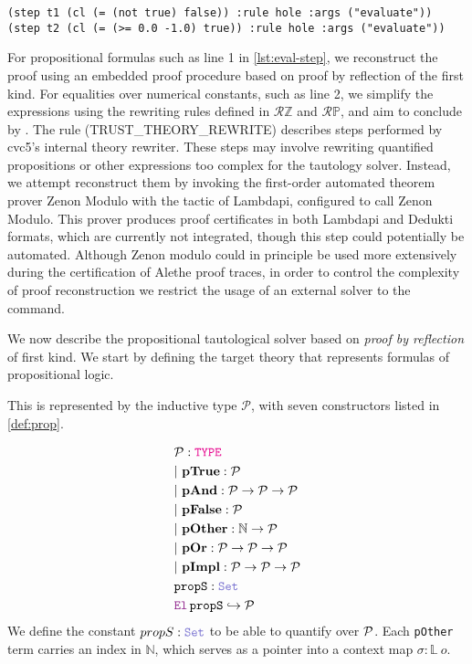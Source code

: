 \smallskip

\begin{lstlisting}[language=SMT,caption={An example of proof trace using the cvc5 $\kw{evaluate}$ rule.},label={lst:eval-step}]
(step t1 (cl (= (not true) false)) :rule hole :args ("evaluate"))
(step t2 (cl (= (>= 0.0 -1.0) true)) :rule hole :args ("evaluate"))
\end{lstlisting}

\smallskip

For propositional formulas such as line 1 in \cref{lst:eval-step}, we reconstruct the proof using an embedded proof procedure based on proof by reflection of the first kind.
For equalities over numerical constants, such as line 2, we simplify the expressions using the rewriting rules defined in $\mathcal{R}{\mathbb{Z}}$ and $\mathcal{R}{\mathbb{P}}$, and aim to conclude by .
The rule  (TRUST\_THEORY\_REWRITE) describes steps performed by cvc5’s internal theory rewriter.
These steps may involve rewriting quantified propositions or other expressions too complex for the tautology solver.
Instead, we attempt reconstruct them by invoking the first-order automated theorem prover Zenon Modulo \cite{zenonmodulo} with the tactic  of Lambdapi, configured to call Zenon Modulo.
This prover produces proof certificates in both Lambdapi and Dedukti formats, which are currently not integrated,  though this step could potentially be automated.
Although Zenon modulo could in principle be used more extensively during the certification of Alethe proof traces, in order to control the complexity of proof reconstruction we restrict the usage of an external solver to the  command.

We now describe the propositional tautological solver based on \emph{proof by reflection} of first kind.
We start by defining the target theory that represents formulas of propositional logic.

\begin{definition}[$\cal{P}$]\label{def:prop}
This is represented by the inductive type $\mathcal{P}$, with seven constructors listed in \cref{def:prop}.

\begin{align*}
& \cal{P} : \type \\
& |~\textbf{pTrue} : \cal{P} \\
& |~\textbf{pAnd} : \cal{P} \ra \cal{P} \ra \cal{P} \\
& |~\textbf{pFalse} : \cal{P} \\
& |~\textbf{pOther} : \N \ra \cal{P} \\
& |~\textbf{pOr} : \cal{P} \ra \cal{P} \ra \cal{P} \\
& |~\textbf{pImpl} : \cal{P} \ra \cal{P} \ra \cal{P} \\
& \kw{propS}: \set \\
& \el\,\kw{propS} \re \cal{P}
\end{align*}
We define the constant $propS: \set$ to be able to quantify over $\cal{P}$.
Each \texttt{pOther} term carries an index in $\mathbb{N}$, which serves as a pointer into a context map $\sigma : \mathbb{L}~o$.
\end{definition}


